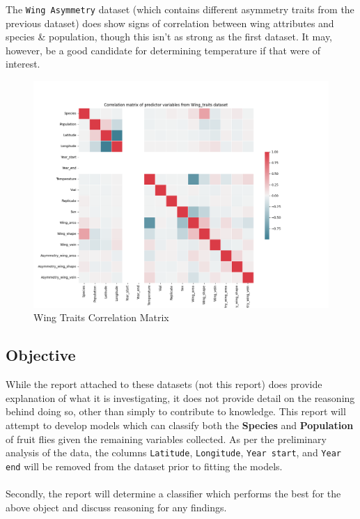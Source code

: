 \documentclass{article}
\begin{document}
\newpage

The \texttt{Wing Asymmetry} dataset (which contains different asymmetry traits from the previous dataset) does show signs of correlation between wing attributes and species \& population, though this isn't as strong as the first dataset. It may, however, be a good candidate for determining temperature if that were of interest.

\begin{figure}[htb]
    \centering
    \includegraphics[width=0.8\columnwidth]{plots/Wing_traits_corr_matrix.png}
    \caption{Wing Traits Correlation Matrix}
    \label{fig:wing_traits_corr_matrix}
\end{figure}

\subsection{Objective}

While the report attached to these datasets (not this report) does provide explanation of what it is investigating, it does not provide detail on the reasoning behind doing so, other than simply to contribute to knowledge. This report will attempt to develop models which can classify both the \textbf{Species} and \textbf{Population} of fruit flies given the remaining variables collected. As per the preliminary analysis of the data, the columns \texttt{Latitude}, \texttt{Longitude}, \texttt{Year start}, and \texttt{Year end} will be removed from the dataset prior to fitting the models. \\
\\
Secondly, the report will determine a classifier which performs the best for the above object and discuss reasoning for any findings.
\end{document}
